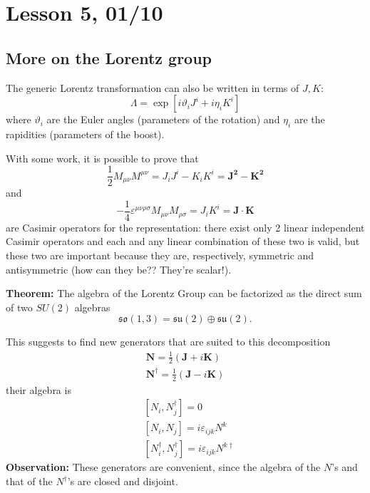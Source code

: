 \newpage
\section{Lesson 5, 01/10}
\subsection{More on the Lorentz group}
The generic Lorentz transformation can also be written in terms of $J,K$:
$$\Lambda = \exp\left[i\vartheta_iJ^i+i\eta_iK^i\right]$$
where $\vartheta_i$ are the Euler angles (parameters of the rotation) and $\eta_i$
are the rapidities (parameters of the boost).

With some work, it is possible to prove that
$$\frac{1}{2}M_{\mu\nu}M^{\mu\nu} = J_iJ^i - K_iK^i = \mathbf{J^2}-\mathbf{K^2}$$
and
$$-\frac{1}{4} \varepsilon^{\mu\nu\rho\sigma}M_{\mu\nu}M_{\rho\sigma} = J_iK^i = 
\mathbf{J}\cdot\mathbf{K}$$
are Casimir operators for the representation: there exist only 2 linear independent
Casimir operators and each and any linear combination of these two is valid, but
these two are important because they are, respectively, symmetric and antisymmetric
(how can they be?? They're scalar!).

\textbf{Theorem:} The algebra of the Lorentz Group can be factorized as the direct
sum of two $SU(2)$ algebras
$$\mathfrak{so}(1,3) = \mathfrak{su}(2)\oplus\mathfrak{su}(2).$$

This suggests to find new generators that are suited to this decomposition
\begin{gather*}
\mathbf{N} = \frac{1}{2}\left(\mathbf{J}+i\mathbf{K}\right)\\
\mathbf{N}^\dagger = \frac{1}{2}\left(\mathbf{J}-i\mathbf{K}\right)
\end{gather*}
their algebra is
\begin{align*}
&\left[N_i,N_j^\dagger\right] = 0\\
&\left[N_i,N_j\right] = i\varepsilon_{ijk}N^k\\
&\left[N_i^\dagger,N_j^\dagger\right] = i\varepsilon_{ijk}N^{k\dagger}
\end{align*}
\textbf{Observation:} These generators are convenient, since the algebra
of the $N$'s and that of the $N^\dagger$'s are closed and disjoint.

